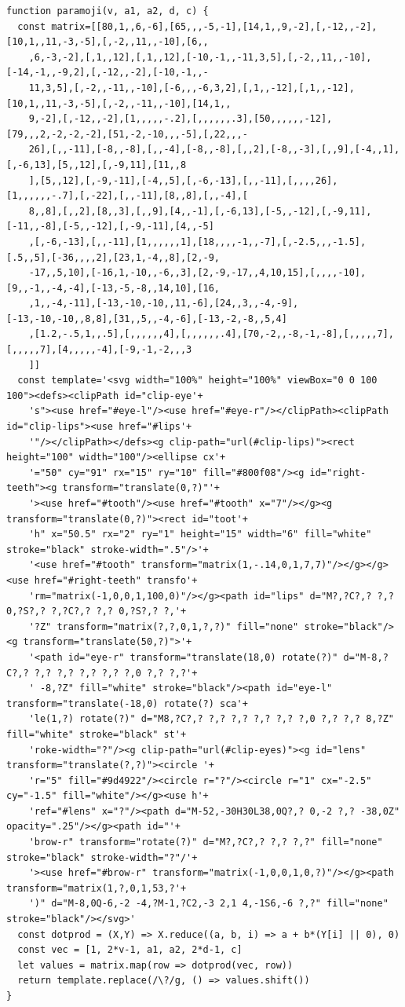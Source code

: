 {\small
\begin{verbatim}
function paramoji(v, a1, a2, d, c) {
  const matrix=[[80,1,,6,-6],[65,,,-5,-1],[14,1,,9,-2],[,-12,,-2],[10,1,,11,-3,-5],[,-2,,11,,-10],[6,,
    ,6,-3,-2],[,1,,12],[,1,,12],[-10,-1,,-11,3,5],[,-2,,11,,-10],[-14,-1,,-9,2],[,-12,,-2],[-10,-1,,-
    11,3,5],[,-2,,-11,,-10],[-6,,,-6,3,2],[,1,,-12],[,1,,-12],[10,1,,11,-3,-5],[,-2,,-11,,-10],[14,1,,
    9,-2],[,-12,,-2],[1,,,,,-.2],[,,,,,,.3],[50,,,,,,-12],[79,,,2,-2,-2,-2],[51,-2,-10,,,-5],[,22,,,-
    26],[,,-11],[-8,,-8],[,,-4],[-8,,-8],[,,2],[-8,,-3],[,,9],[-4,,1],[,-6,13],[5,,12],[,-9,11],[11,,8
    ],[5,,12],[,-9,-11],[-4,,5],[,-6,-13],[,,-11],[,,,,26],[1,,,,,,-.7],[,-22],[,,-11],[8,,8],[,,-4],[
    8,,8],[,,2],[8,,3],[,,9],[4,,-1],[,-6,13],[-5,,-12],[,-9,11],[-11,,-8],[-5,,-12],[,-9,-11],[4,,-5]
    ,[,-6,-13],[,,-11],[1,,,,,,1],[18,,,,-1,,-7],[,-2.5,,,-1.5],[.5,,5],[-36,,,,2],[23,1,-4,,8],[2,-9,
    -17,,5,10],[-16,1,-10,,-6,,3],[2,-9,-17,,4,10,15],[,,,,-10],[9,,-1,,-4,-4],[-13,-5,-8,,14,10],[16,
    ,1,,-4,-11],[-13,-10,-10,,11,-6],[24,,3,,-4,-9],[-13,-10,-10,,8,8],[31,,5,,-4,-6],[-13,-2,-8,,5,4]
    ,[1.2,-.5,1,,.5],[,,,,,,4],[,,,,,,.4],[70,-2,,-8,-1,-8],[,,,,,7],[,,,,,7],[4,,,,,-4],[-9,-1,-2,,,3
    ]]
  const template='<svg width="100%" height="100%" viewBox="0 0 100 100"><defs><clipPath id="clip-eye'+
    's"><use href="#eye-l"/><use href="#eye-r"/></clipPath><clipPath id="clip-lips"><use href="#lips'+
    '"/></clipPath></defs><g clip-path="url(#clip-lips)"><rect height="100" width="100"/><ellipse cx'+
    '="50" cy="91" rx="15" ry="10" fill="#800f08"/><g id="right-teeth"><g transform="translate(0,?)"'+
    '><use href="#tooth"/><use href="#tooth" x="7"/></g><g transform="translate(0,?)"><rect id="toot'+
    'h" x="50.5" rx="2" ry="1" height="15" width="6" fill="white" stroke="black" stroke-width=".5"/>'+
    '<use href="#tooth" transform="matrix(1,-.14,0,1,7,7)"/></g></g><use href="#right-teeth" transfo'+
    'rm="matrix(-1,0,0,1,100,0)"/></g><path id="lips" d="M?,?C?,? ?,? 0,?S?,? ?,?C?,? ?,? 0,?S?,? ?,'+
    '?Z" transform="matrix(?,?,0,1,?,?)" fill="none" stroke="black"/><g transform="translate(50,?)">'+
    '<path id="eye-r" transform="translate(18,0) rotate(?)" d="M-8,?C?,? ?,? ?,? ?,? ?,? ?,0 ?,? ?,?'+
    ' -8,?Z" fill="white" stroke="black"/><path id="eye-l" transform="translate(-18,0) rotate(?) sca'+
    'le(1,?) rotate(?)" d="M8,?C?,? ?,? ?,? ?,? ?,? ?,0 ?,? ?,? 8,?Z" fill="white" stroke="black" st'+
    'roke-width="?"/><g clip-path="url(#clip-eyes)"><g id="lens" transform="translate(?,?)"><circle '+
    'r="5" fill="#9d4922"/><circle r="?"/><circle r="1" cx="-2.5" cy="-1.5" fill="white"/></g><use h'+
    'ref="#lens" x="?"/><path d="M-52,-30H30L38,0Q?,? 0,-2 ?,? -38,0Z" opacity=".25"/></g><path id="'+
    'brow-r" transform="rotate(?)" d="M?,?C?,? ?,? ?,?" fill="none" stroke="black" stroke-width="?"/'+
    '><use href="#brow-r" transform="matrix(-1,0,0,1,0,?)"/></g><path transform="matrix(1,?,0,1,53,?'+
    ')" d="M-8,0Q-6,-2 -4,?M-1,?C2,-3 2,1 4,-1S6,-6 ?,?" fill="none" stroke="black"/></svg>'
  const dotprod = (X,Y) => X.reduce((a, b, i) => a + b*(Y[i] || 0), 0)
  const vec = [1, 2*v-1, a1, a2, 2*d-1, c]
  let values = matrix.map(row => dotprod(vec, row))
  return template.replace(/\?/g, () => values.shift())
}
\end{verbatim}
}
